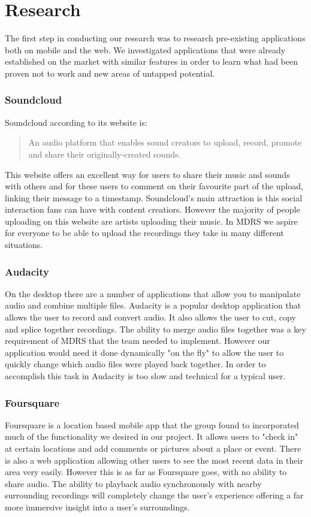 \documentclass{l3proj}
\begin{document}
\chapter{Research}
\label{Research}

The first step in conducting our research was to research pre-existing applications both on mobile and the web. We investigated applications that were already established on the market with similar features in order to learn what had been proven not to work and new areas of untapped potential.

\subsection{Soundcloud}
Soundcloud according to its website is:
\blockquote{An audio platform that enables sound creators to upload, record, promote and share their originally-created sounds.}
This website offers an excellent way for users to share their music and sounds with others and for these users to comment on their favourite part of the upload, linking their message to a timestamp. Soundcloud's main attraction is this social interaction fans can have with content creatiors. However the majority of people uploading on this website are artists uploading their music. In MDRS we aspire for everyone to be able to upload the recordings they take in many different situations.

\subsection{Audacity}

On the desktop there are a number of applications that allow you to manipulate audio and combine multiple files. Audacity is a popular desktop application that allows the user to record and convert audio. It also allows the user to cut, copy and splice together recordings. The ability to merge audio files together was a key requirement of MDRS that the team needed to implement. However our application would need it done dynamically "on the fly" to allow the user to quickly change which audio files were played back together. In order to accomplish this task in Audacity is too slow and technical for a typical user.

\subsection{Foursquare}

Foursquare is a location based mobile app that the group found to incorporated much of the functionality we desired in our project. It allows users to "check in" at certain locations and add comments or pictures about a place or event. There is also a web application allowing other users to see the most recent data in their area very easily. However this is as far as Foursquare goes, with no ability to share audio. The ability to playback audio synchronously with nearby surrounding recordings will completely change the user's experience offering a far more immersive insight into a user's surroundings.
\end{document}
